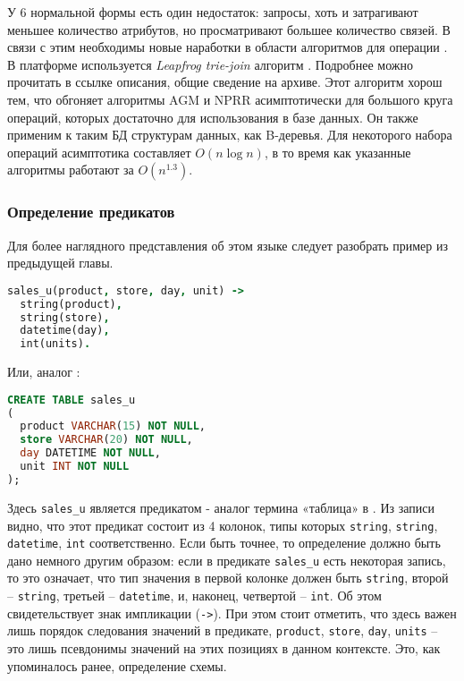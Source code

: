 У 6 нормальной формы есть один недостаток: запросы, хоть и затрагивают меньшее количество атрибутов, но просматривают большее количество связей. В связи с этим необходимы новые наработки в области алгоритмов для операции \join. В платформе используется \emph{Leapfrog trie-join} алгоритм \cite{leapfrog_tree_join_algo}. Подробнее можно прочитать в ссылке описания, общие сведение на архиве. Этот алгоритм хорош тем, что обгоняет алгоритмы AGM и NPRR асимптотически для большого круга операций, которых достаточно для использования в базе данных. Он также применим к таким БД структурам данных, как B-деревья. Для некоторого набора операций асимптотика составляет $O(n\log{n})$, в то время как указанные алгоритмы работают за $O(n^{1.3})$.


\subsubsection{Определение предикатов}
\label{sec:technology:logiql:predicates}

Для более наглядного представления об этом языке следует разобрать пример из предыдущей главы.

\begin{lstlisting}[language=Prolog]
sales_u(product, store, day, unit) ->
  string(product),
  string(store),
  datetime(day),
  int(units).
\end{lstlisting}

Или, аналог \sql:

\begin{lstlisting}[language=SQL]
CREATE TABLE sales_u
(
  product VARCHAR(15) NOT NULL,
  store VARCHAR(20) NOT NULL,
  day DATETIME NOT NULL,
  unit INT NOT NULL
);
\end{lstlisting}

Здесь \lstinline{sales_u} является предикатом - аналог термина «таблица» в
\sql. Из записи видно, что этот предикат состоит из 4 колонок, типы которых \lstinline{string}, \lstinline{string}, \lstinline{datetime}, \lstinline{int} соответственно. Если быть точнее, то определение должно быть дано немного другим образом: если в предикате \lstinline{sales_u} есть некоторая запись, то это означает, что тип значения в первой колонке должен быть \lstinline{string}, второй – \lstinline{string}, третьей – \lstinline{datetime}, и, наконец, четвертой – \lstinline{int}. Об этом свидетельствует знак импликации (\lstinline{->}). При этом стоит отметить, что здесь важен лишь порядок следования значений в предикате, \lstinline{product}, \lstinline{store}, \lstinline{day}, \lstinline{units} – это лишь псевдонимы значений на этих позициях в данном контексте. Это, как упоминалось ранее, определение схемы.

